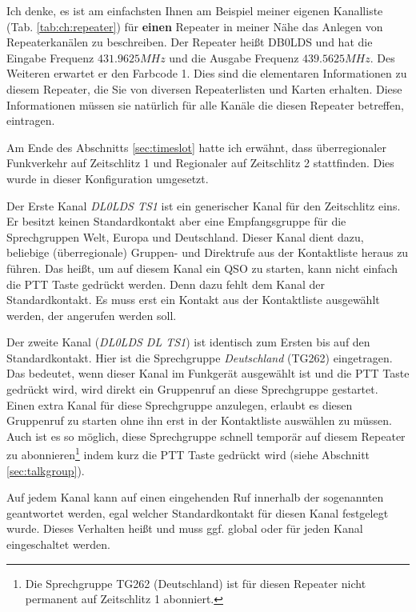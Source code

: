 Ich denke, es ist am einfachsten Ihnen am Beispiel meiner eigenen Kanalliste (Tab. \ref{tab:ch:repeater}) für \textbf{einen} Repeater in meiner Nähe das Anlegen von Repeaterkanälen zu beschreiben. Der Repeater heißt DB0LDS und hat die Eingabe Frequenz $431.9625 MHz$ und die Ausgabe Frequenz $439.5625 MHz$. Des Weiteren erwartet er den Farbcode 1. Dies sind die elementaren Informationen zu diesem Repeater, die Sie von diversen Repeaterlisten und Karten erhalten. Diese Informationen müssen sie natürlich für alle Kanäle die diesen Repeater betreffen, eintragen.

Am Ende des Abschnitts \ref{sec:timeslot} hatte ich erwähnt, dass überregionaler Funkverkehr auf Zeitschlitz 1 und Regionaler auf Zeitschlitz 2 stattfinden. Dies wurde in dieser Konfiguration umgesetzt. 

Der Erste Kanal \emph{DL0LDS TS1} ist ein generischer Kanal für den Zeitschlitz eins. Er besitzt keinen Standardkontakt aber eine Empfangsgruppe für die Sprechgruppen Welt, Europa und Deutschland. Dieser Kanal dient dazu, beliebige (überregionale) Gruppen- und Direktrufe aus der Kontaktliste heraus zu führen. Das heißt, um auf diesem Kanal ein QSO zu starten, kann nicht einfach die PTT Taste gedrückt werden. Denn dazu fehlt dem Kanal der Standardkontakt. Es muss erst ein Kontakt aus der Kontaktliste ausgewählt werden, der angerufen werden soll. 

Der zweite Kanal (\emph{DL0LDS DL TS1}) ist identisch zum Ersten bis auf den Standardkontakt. Hier ist die Sprechgruppe \emph{Deutschland} (TG262) eingetragen. Das bedeutet, wenn dieser Kanal im Funkgerät ausgewählt ist und die PTT Taste gedrückt wird, wird direkt ein Gruppenruf an diese Sprechgruppe gestartet. Einen extra Kanal für diese Sprechgruppe anzulegen, erlaubt es diesen Gruppenruf zu starten ohne ihn erst in der Kontaktliste auswählen zu müssen. Auch ist es so möglich, diese Sprechgruppe schnell temporär auf diesem Repeater zu abonnieren\footnote{Die Sprechgruppe TG262 (Deutschland) ist für diesen Repeater nicht permanent auf Zeitschlitz 1 abonniert.} indem kurz die PTT Taste gedrückt wird (siehe Abschnitt \ref{sec:talkgroup}).

\begin{merke}
 Auf jedem Kanal kann auf einen eingehenden Ruf innerhalb der sogenannten  geantwortet werden, egal welcher Standardkontakt für diesen Kanal festgelegt wurde. Dieses Verhalten heißt  und muss ggf. global oder für jeden Kanal eingeschaltet werden.
\end{merke} 

